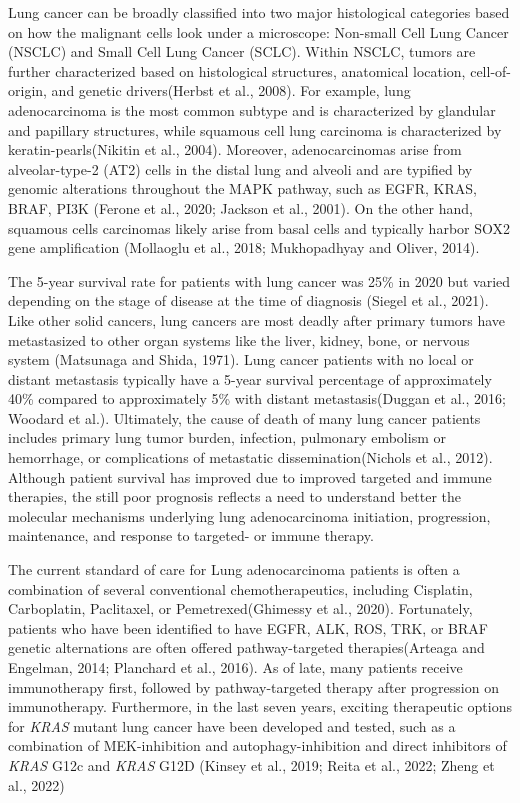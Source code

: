 Lung cancer can be broadly classified into two major histological categories based on how the malignant cells look under a microscope: Non-small Cell Lung Cancer (NSCLC) and Small Cell Lung Cancer (SCLC). Within NSCLC, tumors are further characterized based on histological structures, anatomical location, cell-of-origin, and genetic drivers(Herbst et al., 2008). For example, lung adenocarcinoma is the most common subtype and is characterized by glandular and papillary structures, while squamous cell lung carcinoma is characterized by keratin-pearls(Nikitin et al., 2004). Moreover, adenocarcinomas arise from alveolar-type-2 (AT2) cells in the distal lung and alveoli and are typified by genomic alterations throughout the MAPK pathway, such as EGFR, KRAS, BRAF, PI3K (Ferone et al., 2020; Jackson et al., 2001). On the other hand, squamous cells carcinomas likely arise from basal cells and typically harbor SOX2 gene amplification (Mollaoglu et al., 2018; Mukhopadhyay and Oliver, 2014).

The 5-year survival rate for patients with lung cancer was 25\% in 2020 but varied depending on the stage of disease at the time of diagnosis (Siegel et al., 2021). Like other solid cancers, lung cancers are most deadly after primary tumors have metastasized to other organ systems like the liver, kidney, bone, or nervous system (Matsunaga and Shida, 1971). Lung cancer patients with no local or distant metastasis typically have a 5-year survival percentage of approximately 40\% compared to approximately 5\% with distant metastasis(Duggan et al., 2016; Woodard et al.). Ultimately, the cause of death of many lung cancer patients includes primary lung tumor burden, infection, pulmonary embolism or hemorrhage, or complications of metastatic dissemination(Nichols et al., 2012). Although patient survival has improved due to improved targeted and immune therapies, the still poor prognosis reflects a need to understand better the molecular mechanisms underlying lung adenocarcinoma initiation, progression, maintenance, and response to targeted- or immune therapy.

The current standard of care for Lung adenocarcinoma patients is often a combination of several conventional chemotherapeutics, including Cisplatin, Carboplatin, Paclitaxel, or Pemetrexed(Ghimessy et al., 2020). Fortunately, patients who have been identified to have EGFR, ALK, ROS, TRK, or BRAF genetic alternations are often offered pathway-targeted therapies(Arteaga and Engelman, 2014; Planchard et al., 2016). As of late, many patients receive immunotherapy first, followed by pathway-targeted therapy after progression on immunotherapy. Furthermore, in the last seven years, exciting therapeutic options for \emph{KRAS} mutant lung cancer have been developed and tested, such as a combination of MEK-inhibition and autophagy-inhibition and direct inhibitors of \emph{KRAS} G12c and \emph{KRAS} G12D (Kinsey et al., 2019; Reita et al., 2022; Zheng et al., 2022)

